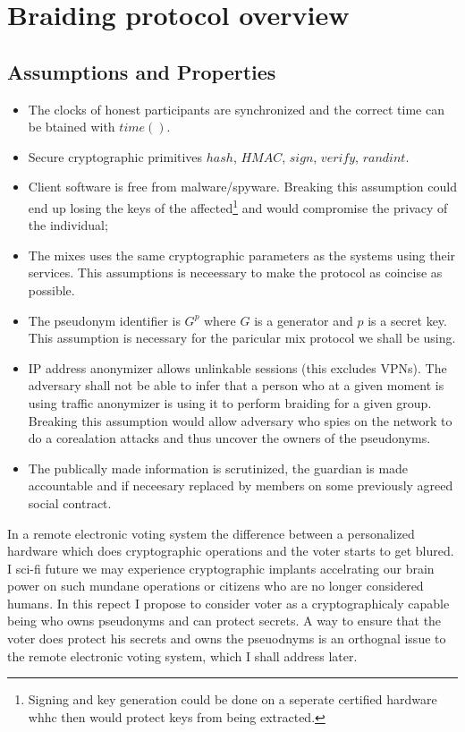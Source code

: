 \documentclass[12pt]{article}
\begin{document}
\section*{Braiding protocol overview}

\subsection*{Assumptions and Properties}

\begin{itemize}
\item The clocks of honest participants are synchronized and the correct time can be btained with $time()$.
\item Secure cryptographic primitives $hash$, $HMAC$, $sign$, $verify$, $randint$.
\item Client software is free from malware/spyware. Breaking this assumption could end up losing the keys of the affected\footnote{Signing and key generation could be done on a seperate certified hardware whhc then would protect keys from being extracted.} and would compromise the privacy of the individual;
\item The mixes uses the same cryptographic parameters as the systems using their services. This assumptions is neceessary to make the protocol as coincise as possible.
\item The pseudonym identifier is $G^p$ where $G$ is a generator and $p$ is a secret key. This assumption is necessary for the paricular mix protocol we shall be using.
\item IP address anonymizer allows unlinkable sessions (this excludes VPNs). The adversary shall not be able to infer that a person who at a given moment is using traffic anonymizer is using it to perform braiding for a given group. Breaking this assumption would allow adversary who spies on the network to do a corealation attacks and thus uncover the owners of the pseudonyms. 
\item The publically made information is scrutinized, the guardian is made accountable and if neceesary replaced by members on some previously agreed social contract. 
\end{itemize}



In a remote electronic voting system the difference between a personalized hardware which does cryptographic operations and the voter starts to get blured. I sci-fi future we may experience cryptographic implants accelrating our brain power on such mundane operations or citizens who are no longer considered humans. In this repect I propose to consider voter as a cryptographicaly capable being who owns pseudonyms and can protect secrets. A way to ensure that the voter does protect his secrets and owns the pseuodnyms is an orthognal issue to the remote electronic voting system, which I shall address later. 
\end{document}
